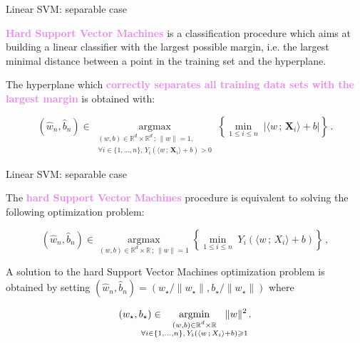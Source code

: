\documentclass[9pt]{beamer}
\DeclareMathOperator*{\argmax}{argmax}%
\DeclareMathOperator*{\argmin}{argmin}%
\newcommand{\eqsp}{\,}
\newcommand{\bX}{\textbf{X}}
\begin{document}
\begin{frame}{Linear SVM: separable case}

\textcolor{violet}{{\bf  Hard Support Vector Machines}}  is a classification procedure which aims at  building a linear classifier with the largest possible margin, i.e. \alert{the largest minimal distance between a point in the training set and the hyperplane}.

\vspace{.5cm}

The hyperplane which \textcolor{violet}{{\bf correctly separates all training data sets with the largest margin}} is obtained with:

\vspace{.3cm}
\[
(\widehat w_n,\widehat b_n)\in \underset{\substack{(w,b)\in\mathbb{R}^d\times \mathbb{R}^d\eqsp;\eqsp \|w\|=1,\\ \forall i\in\{1,\ldots,n\},\eqsp Y_i\left(\langle w\eqsp;\eqsp \bX_i\rangle + b\right) > 0}}{\argmax}\left\{\underset{1\leqslant i \leqslant n}{\min}\;\left|\langle w\eqsp;\eqsp \bX_i\rangle + b\right|\right\}\eqsp.
\]
\end{frame}

\begin{frame}{Linear SVM: separable case}

The \textcolor{violet}{{\bf hard Support Vector Machines}} procedure is equivalent to solving the following optimization problem:

\vspace{.3cm}
\[
(\widehat w_n,\widehat b_n)\in \underset{(w,b)\in\mathbb{R}^d\times \mathbb{R}\eqsp;\eqsp \|w\|=1}{\argmax}\left\{\underset{1\leqslant i \leqslant n}{\min}\;Y_i\left(\langle w\eqsp;\eqsp X_i\rangle + b\right)\right\}\eqsp,
\]

\vspace{.5cm}

A \alert{solution to the hard Support Vector Machines optimization} problem is obtained by setting  $(\widehat w_n,\widehat b_n) = (w_\star/\|w_\star\|,b_\star/\|w_\star\|)$ where

\vspace{.3cm}

\begin{equation*}
(w_\star,b_\star)\in  \hspace{-.8cm}  \underset{\substack{(w,b)\in\mathbb{R}^d\times \mathbb{R}\\ \forall i\in\{1,\ldots,n\},\eqsp Y_i\left(\langle w\eqsp;\eqsp X_i\rangle + b\right)\geqslant 1}}{\argmin} \hspace{-.8cm} \|w\|^2\eqsp.
\end{equation*}

\end{frame}
\end{document}
